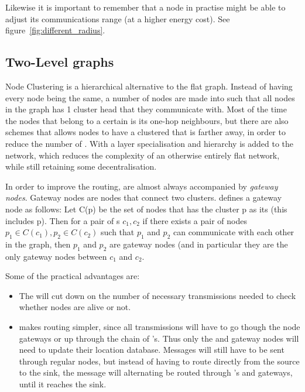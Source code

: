 
Likewise it is important to remember that a node in practise might be able to adjust its communications range (at a higher energy cost). See figure~\ref{fig:different_radius}.

\subsection{Two-Level graphs}
\label{cluster methods}
Node Clustering is a hierarchical alternative to the flat graph. Instead of having every node being the same, a number of nodes are made into \ch such that all nodes in the graph has 1 cluster head that they communicate with. Most of the time the nodes that belong to a certain \ch is its one-hop neighbours, but there are also schemes that allows nodes to have a clustered that is farther away, in order to reduce the number of \ch. With \ch a layer specialisation and hierarchy is added to the network, which reduces the complexity of an otherwise entirely flat network, while still retaining some decentralisation.

In order to improve the routing, \ch are almost always accompanied by \emph{gateway nodes}. Gateway nodes are nodes that connect two clusters. \cite{spanners} defines a gateway node as follows:
Let C(p) be the set of nodes that has the cluster p as its \ch (this includes p). Then for a pair of \ch s $c_1, c_2$ if there exists a pair of nodes $p_1 \in C(c_1), p_2 \in C(c_2)$ such that $p_1$ and $p_2$ can communicate with each other in the graph, then $p_1$ and $p_2$ are gateway nodes (and in particular they are the only gateway nodes between $c_1$ and $c_2$.  

Some of the practical advantages are:
\begin{itemize}
\item The \ch will cut down on the number of necessary transmissions needed to check whether nodes are alive or not.
\item \ch makes routing simpler, since all transmissions will have to go though the node gateways or up through the chain of \ch's. Thus only the \ch and gateway nodes will need to update their location database. Messages will still have to be sent through regular nodes, but instead of having to route directly from the source to the sink, the message will alternating be routed through \ch's and gateways, until it reaches the sink.
\end{itemize}

